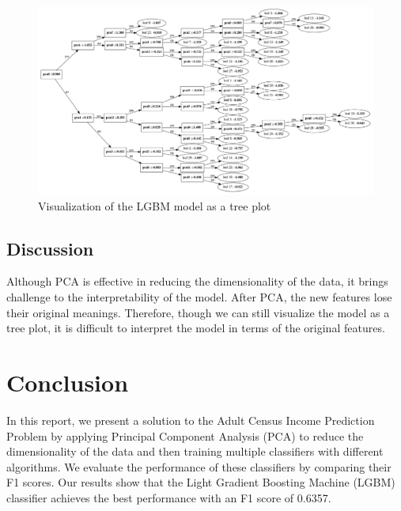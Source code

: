 \documentclass[conference]{IEEEtran}
\begin{document}
\begin{figure}[!ht]
    \centering
    \includegraphics[width=\linewidth]{figure/LGBM Tree Plot.png}
    \caption{Visualization of the LGBM model as a tree plot}
    \label{fig:lgbm_tree_plot}
\end{figure}

\subsection{Discussion}

Although PCA is effective in reducing the dimensionality of the data, it brings challenge to the interpretability of the model.
After PCA, the new features lose their original meanings.
Therefore, though we can still visualize the model as a tree plot, it is difficult to interpret the model in terms of the original features.

\section{Conclusion}

In this report, we present a solution to the Adult Census Income Prediction Problem by applying Principal Component Analysis (PCA) to reduce the dimensionality of the data and then training multiple classifiers with different algorithms.
We evaluate the performance of these classifiers by comparing their F1 scores.
Our results show that the Light Gradient Boosting Machine (LGBM) classifier achieves the best performance with an F1 score of 0.6357.

\printbibliography
\end{document}
